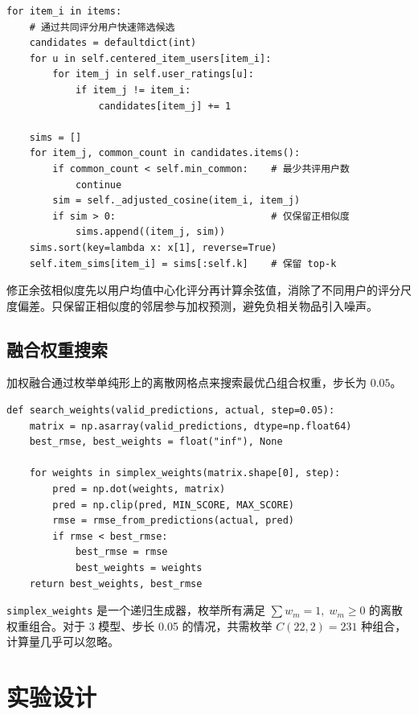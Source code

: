 \documentclass[UTF8,a4paper,10pt]{ctexart}
\begin{document}
\begin{lstlisting}[caption={物品相似度计算与邻居筛选（\texttt{knn\_cf.py}）}, label={lst:knn}]
for item_i in items:
    # 通过共同评分用户快速筛选候选
    candidates = defaultdict(int)
    for u in self.centered_item_users[item_i]:
        for item_j in self.user_ratings[u]:
            if item_j != item_i:
                candidates[item_j] += 1

    sims = []
    for item_j, common_count in candidates.items():
        if common_count < self.min_common:    # 最少共评用户数
            continue
        sim = self._adjusted_cosine(item_i, item_j)
        if sim > 0:                           # 仅保留正相似度
            sims.append((item_j, sim))
    sims.sort(key=lambda x: x[1], reverse=True)
    self.item_sims[item_i] = sims[:self.k]    # 保留 top-k
\end{lstlisting}

修正余弦相似度先以用户均值中心化评分再计算余弦值，消除了不同用户的评分尺度偏差。只保留正相似度的邻居参与加权预测，避免负相关物品引入噪声。

\subsection{融合权重搜索}

加权融合通过枚举单纯形上的离散网格点来搜索最优凸组合权重，步长为 $0.05$。

\begin{lstlisting}[caption={单纯形权重搜索（\texttt{ensemble.py}）}, label={lst:ensemble}]
def search_weights(valid_predictions, actual, step=0.05):
    matrix = np.asarray(valid_predictions, dtype=np.float64)
    best_rmse, best_weights = float("inf"), None

    for weights in simplex_weights(matrix.shape[0], step):
        pred = np.dot(weights, matrix)
        pred = np.clip(pred, MIN_SCORE, MAX_SCORE)
        rmse = rmse_from_predictions(actual, pred)
        if rmse < best_rmse:
            best_rmse = rmse
            best_weights = weights
    return best_weights, best_rmse
\end{lstlisting}

\texttt{simplex\_weights} 是一个递归生成器，枚举所有满足 $\sum w_m = 1,\; w_m \ge 0$ 的离散权重组合。对于 3 模型、步长 0.05 的情况，共需枚举 $C(22,2)=231$ 种组合，计算量几乎可以忽略。

\section{实验设计}
\end{document}
